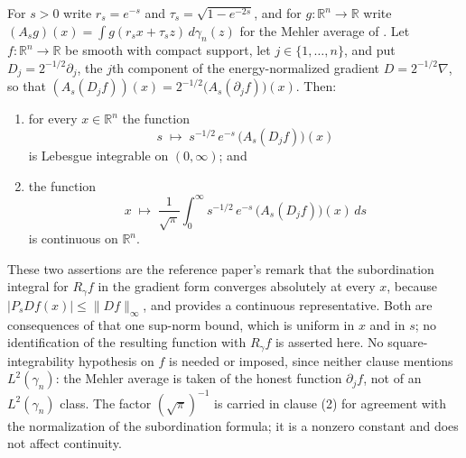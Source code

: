 \begin{lemma}
For $s > 0$ write $r_s = e^{-s}$ and $\tau_s = \sqrt{1-e^{-2s}}$, and for
$g : \mathbb{R}^n \to \mathbb{R}$ write
$(A_s g)(x) = \int g(r_sx+\tau_sz)\,d\gamma_n(z)$ for the Mehler average of
.  Let $f : \mathbb{R}^n \to \mathbb{R}$ be smooth with
compact support, let $j \in \{1,\ldots,n\}$, and put $D_j = 2^{-1/2}\partial_j$,
the $j$th component of the energy-normalized gradient $D = 2^{-1/2}\nabla$, so
that
$(A_s(D_jf))(x) = 2^{-1/2}\bigl(A_s(\partial_jf)\bigr)(x)$.  Then:
\begin{enumerate}
\item for every $x \in \mathbb{R}^n$ the function
\[
  s \;\longmapsto\; s^{-1/2}\,e^{-s}\,\bigl(A_s(D_jf)\bigr)(x)
\]
is Lebesgue integrable on $(0,\infty)$; and
\item the function
\[
  x \;\longmapsto\; \frac{1}{\sqrt\pi}\int_0^\infty
      s^{-1/2}\,e^{-s}\,\bigl(A_s(D_jf)\bigr)(x)\,ds
\]
is continuous on $\mathbb{R}^n$.
\end{enumerate}

These two assertions are the reference paper's remark that the subordination
integral for $R_\gamma f$ in the gradient form converges absolutely at every $x$,
because $|P_sDf(x)| \leq \|Df\|_\infty$, and provides a continuous
representative.  Both are consequences of that one sup-norm bound, which is
uniform in $x$ and in $s$; no identification of the resulting function with
$R_\gamma f$ is asserted here.  No square-integrability hypothesis on $f$ is
needed or imposed, since neither clause mentions $L^2(\gamma_n)$: the Mehler
average is taken of the honest function $\partial_jf$, not of an
$L^2(\gamma_n)$ class.  The factor $(\sqrt\pi)^{-1}$ is carried in clause (2)
for agreement with the normalization of the subordination formula; it is a
nonzero constant and does not affect continuity.
\end{lemma}
